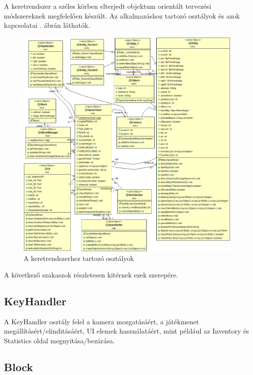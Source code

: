 

A keretrendszer a széles körben elterjedt objektum orientált tervezési módszereknek megfelelően készült. Az alkalmazáshoz tartozó osztályok és azok kapcsolatai . ábrán láthatók.

\begin{figure}[!ht]
    \centering
    \includegraphics[width=\textwidth]{images/UML.png}
    \caption{A keretrendszerhez tartozó osztályok}
    \label{fig:UML}
\end{figure}

A következő szakaszok részletesen kitérnek ezek szerepére.

\subsection{KeyHandler}

A KeyHandler osztály felel a kamera mozgatásáért, a játékmenet megállításért/elinditásáért, UI elemek használatáért, 
mint például az Inventory és Statistics oldal megnyitása/bezárása.

\subsection{Block}

